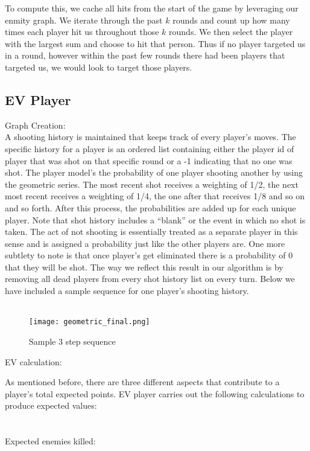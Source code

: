 \documentclass[
10pt, %
letterpaper, %
oneside, %
headinclude,footinclude, %
english
]{article}
\begin{document}
To compute this, we cache all hits from the start of the game by leveraging our enmity graph. We iterate through the past $k$ rounds and count up how many times each player hit us throughout those $k$ rounds. We then select the player with the largest sum and choose to hit that person. Thus if no player targeted us in a round, however within the past few rounds there had been players that targeted us, we would look to target those players.


\subsection{EV Player}


Graph Creation:
\\
A shooting history is maintained that keeps track of every player’s moves. The specific history for a player is an ordered list containing either the player id of player that was shot on that specific round or a -1 indicating that no one was shot. The player model’s the probability of one player shooting another by using the geometric series. The most recent shot receives a weighting of 1/2, the next most recent receives a weighting of 1/4, the one after that receives 1/8 and so on and so forth. After this process, the probabilities are added up for each unique player. Note that shot history includes a “blank” or the event in which no shot is taken. The act of not shooting is essentially treated as a separate player in this sense and is assigned a probability just like the other players are. One more subtlety to note is that once player’s get eliminated there is a probability of 0 that they will be shot. The way we reflect this result in our algorithm is by removing all dead players from every shot history list on every turn.  Below we have included a sample sequence for one player's shooting history. 
\\
\\


\begin{figure}[h]
\centering
\texttt{[image: geometric\_final.png]}
\caption[Final logistic curve with $\beta=0.06,\mu=0.4$]{Sample 3 step sequence}
\label{fig:gallery3}
\end{figure}


EV calculation: 

As mentioned before, there are three different aspects that contribute to a player’s total expected points. EV player carries out the following calculations to produce expected values:
\\
\\
\\
Expected enemies killed: 
\end{document}
